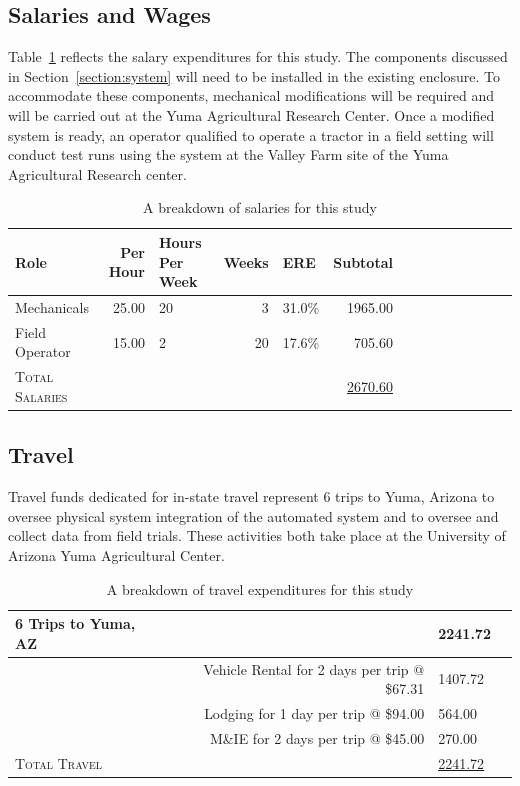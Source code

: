 \documentclass[12pt]{article}
\begin{document}
{\subsection{Salaries and Wages}
Table~\ref{table:salaries} reflects the salary expenditures for this study.  The components discussed in Section~\ref{section:system} will need to be installed in the existing enclosure. To accommodate these components, mechanical modifications will be required and will be carried out at the Yuma Agricultural Research Center. Once a modified system is ready, an operator qualified to operate a tractor in a field setting will conduct test runs using the system at the Valley Farm site of the Yuma Agricultural Research center.
\begin{table}[H] %
\centering
\begin{tabular}{lrlrlrlrlrlrlr}
 	\toprule
	Role & Per Hour & Hours Per Week & Weeks & ERE & Subtotal \\
	\toprule
	Mechanicals & 25.00 & 20 & 3 & 31.0\% & 1965.00 \\
	Field Operator & 15.00 & 2 & 20 & 17.6\% & 705.60 \\
	\toprule
	\toprule
	\textsc{Total Salaries} & & & & & \underline{2670.60} \\

	\bottomrule
    \bottomrule                
\end{tabular}
\caption[Salary Breakdown]{A breakdown of salaries for this study}
\label{table:salaries}
\end{table}

%
%

\subsection{Travel}
Travel funds dedicated for in-state travel represent 6 trips to Yuma, Arizona to oversee physical system integration of the automated system and to oversee and collect data from field trials. These activities both take place at the University of Arizona Yuma Agricultural Center.
\begin{table}[H] %
\centering
\begin{tabular}{lrlr}
 	\toprule
	\toprule
	6 Trips to Yuma, AZ & & 2241.72 \\
	\midrule
	& Vehicle Rental for 2 days per trip @ \$67.31 & 1407.72 \\
	& Lodging for 1 day per trip @ \$94.00 & 564.00 \\
	& M\&IE for 2 days per trip @ \$45.00 & 270.00 \\
	\toprule
	\toprule
	\textsc{Total Travel}                      & & \underline{2241.72} \\
	\bottomrule
    \bottomrule                
\end{tabular}
\caption[Travel Budget Breakdown]{A breakdown of travel expenditures for this study}
\label{table:travel}
\end{table}

}
\end{document}
